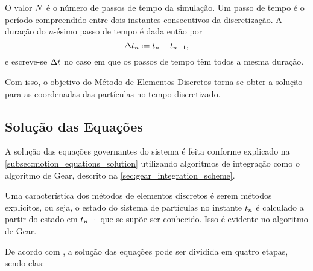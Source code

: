 O valor \(\numberOfTimesteps\) é o número de passos de tempo da simulação. Um passo de tempo é o período compreendido entre dois instantes consecutivos da discretização. A duração do \(n\)-ésimo passo de tempo é dada então por
\begin{equation*}
	\Dt[n] \eqdef \instant[n] - \instant[n-1],
\end{equation*}
e escreve-se \(\Dt\) no caso em que os passos de tempo têm todos a mesma duração.

Com isso, o objetivo do Método de Elementos Discretos torna-se obter a solução para as coordenadas das partículas no tempo discretizado.

\subsection{Solução das Equações}

A solução das equações governantes do sistema é feita conforme explicado na \autoref{subsec:motion_equations_solution} utilizando algoritmos de integração como o algoritmo de Gear, descrito na \autoref{sec:gear_integration_scheme}.

Uma característica dos métodos de elementos discretos é serem métodos explícitos, ou seja, o estado do sistema de partículas no instante \(\instant[n]\) é calculado a partir do estado em \(\instant[n-1]\) que se supõe ser conhecido. Isso é evidente no algoritmo de Gear.

De acordo com , a solução das equações pode ser dividida em quatro etapas, sendo elas:

